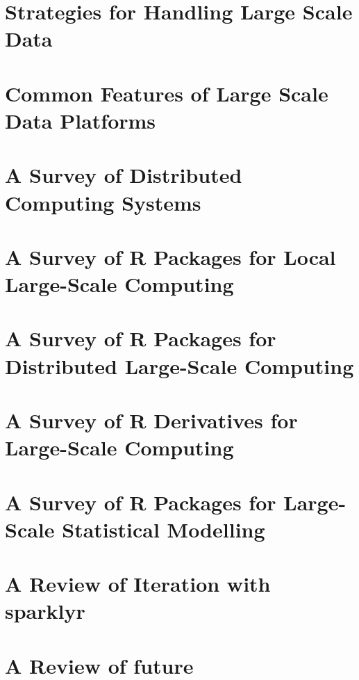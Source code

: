 

\section{Strategies for Handling Large Scale Data}\label{sec:lit-review-strategies}

\section{Common Features of Large Scale Data Platforms}\label{sec:large-scale-features}

\section{A Survey of Distributed Computing Systems}\label{sec:survey-dist-comp-sys}

\section{A Survey of R Packages for Local Large-Scale Computing}\label{sec:survey-r-local-packages}

\section{A Survey of R Packages for Distributed Large-Scale Computing}\label{sec:survey-r-dist-packages}

\section{A Survey of R Derivatives for Large-Scale Computing}\label{sec:survey-r-deriv}

\section{A Survey of R Packages for Large-Scale Statistical Modelling}\label{sec:survey-r-stat-model-packages}

\section{A Review of Iteration with sparklyr}\label{sec:review-iteration-sparklyr}

\section{A Review of future}\label{sec:future-detail}

